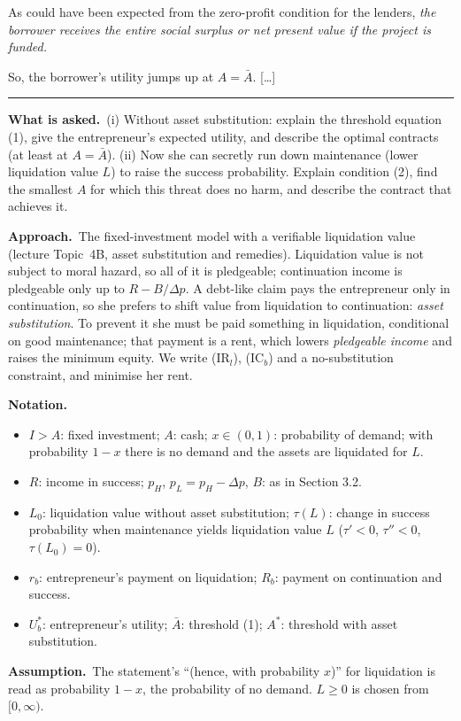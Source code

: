 \documentclass[11pt,a4paper]{article}
\newcommand{\notation}{\par\noindent\textbf{Notation.}}
\newcommand{\assume}{\par\smallskip\noindent\textbf{Assumption.}~}
\newcommand{\asked}{\par\medskip\noindent\textbf{What is asked.}~}
\newcommand{\approach}{\par\smallskip\noindent\textbf{Approach.}~}
\newcommand{\stmtend}{\par\endgroup\nopagebreak\noindent\rule{\linewidth}{0.4pt}\par\medskip}
\begin{document}
As could have been expected from the zero-profit condition for the lenders, \emph{the borrower
receives the entire social surplus or net present value if the project is funded.}

So, the borrower's utility jumps up at \(A = \bar A\). {[}\ldots{]}
\stmtend

\asked (i) Without asset substitution: explain the threshold equation (1), give the
entrepreneur's expected utility, and describe the optimal contracts (at least at $A=\bar A$).
(ii) Now she can secretly run down maintenance (lower liquidation value $L$) to raise the success
probability. Explain condition (2), find the smallest $A$ for which this threat does no harm, and
describe the contract that achieves it.

\approach The fixed-investment model with a verifiable liquidation value (lecture Topic~4B, asset
substitution and remedies). Liquidation value is not subject to moral hazard, so all of it is
pledgeable; continuation income is pledgeable only up to $R-B/\Delta p$. A debt-like claim pays the
entrepreneur only in continuation, so she prefers to shift value from liquidation to continuation:
\emph{asset substitution}. To prevent it she must be paid something in liquidation, conditional on
good maintenance; that payment is a rent, which lowers \emph{pledgeable income} and raises the
minimum equity. We write (IR$_l$), (IC$_b$) and a no-substitution constraint, and minimise her rent.

\notation
\begin{itemize}
  \item $I>A$: fixed investment; $A$: cash; $x\in(0,1)$: probability of demand; with probability $1-x$
        there is no demand and the assets are liquidated for $L$.
  \item $R$: income in success; $p_H$, $p_L=p_H-\Delta p$, $B$: as in Section 3.2.
  \item $L_0$: liquidation value without asset substitution; $\tau(L)$: change in success probability
        when maintenance yields liquidation value $L$ ($\tau'<0$, $\tau''<0$, $\tau(L_0)=0$).
  \item $r_b$: entrepreneur's payment on liquidation; $R_b$: payment on continuation and success.
  \item $U_b^*$: entrepreneur's utility; $\bar A$: threshold (1); $A^*$: threshold with asset substitution.
\end{itemize}
\assume The statement's ``(hence, with probability $x$)'' for liquidation is read as probability $1-x$,
the probability of no demand. $L\ge0$ is chosen from $[0,\infty)$.
\end{document}
